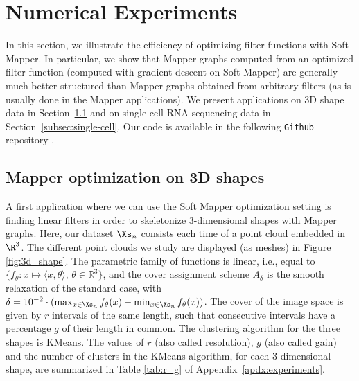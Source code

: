\section{Numerical Experiments}\label{sec:experiments}


In this section, we illustrate the efficiency of optimizing filter functions with Soft Mapper.
In particular, we show that Mapper graphs computed from an optimized filter function (computed with
gradient descent on Soft Mapper) are generally much better structured than Mapper graphs obtained
from arbitrary filters (as is usually done in the Mapper applications). We present applications on 
3D shape data in Section~\ref{subsec:expe-3d} and on single-cell RNA sequencing data in Section~\ref{subsec:single-cell}.
Our code is available in the following \texttt{Github} repository \cite{github}.

\subsection{Mapper optimization on 3D shapes}
\label{subsec:expe-3d}

A first application where we can use the Soft Mapper optimization setting is finding linear filters in order to skeletonize 3-dimensional shapes with Mapper graphs.
Here, our dataset $\Xs_n$ consists each time of a point cloud embedded in $\R^3$. The different point clouds we study are displayed (as meshes) in Figure \ref{fig:3d_shape}.
The parametric family of functions is linear, i.e., equal to $\{f_\theta\colon x\mapsto\langle x,\theta \rangle,\,\theta\in\mathbb{R}^3\}$, and the cover assignment scheme $A_\delta$ is the smooth relaxation of the standard case, with $\delta=10^{-2}\cdot(\max_{x\in\Xs_n}f_\theta(x)-\min_{x\in\Xs_n}f_\theta(x))$. The cover of the image space is given by $r$ intervals of the same length, such that consecutive intervals have a percentage $g$ of their length in common. The clustering algorithm for the three shapes is KMeans. The values of $r$ (also called resolution), $g$ (also called gain) and the number of clusters in the KMeans algorithm, for each 3-dimensional shape, are summarized in Table \ref{tab:r_g} of Appendix~\ref{apdx:experiments}.

